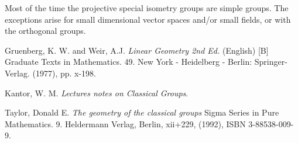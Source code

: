 \documentclass[12pt]{article}
\begin{document}
Most of the time the projective special isometry groups are simple groups.
The exceptions arise for small dimensional vector spaces and/or small fields, or with the orthogonal groups.



\providecommand{\bysame}{\leavevmode\hbox to3em{\hrulefill}\thinspace}
\providecommand{\MR}{\relax\ifhmode\unskip\space\fi MR }
\providecommand{\MRhref}[2]{%
\href{http://www.ams.org/mathscinet-getitem?mr=#1}{#2}
}
\providecommand{\href}[2]{#2}
\begin{thebibliography}{10}


Gruenberg, K. W. and Weir, A.J.
\emph{Linear Geometry 2nd Ed.} (English)
[B] Graduate Texts in Mathematics. 49. New York - Heidelberg - Berlin: Springer-Verlag. (1977), pp. x-198.

Kantor, W. M.
\emph{Lectures notes on Classical Groups}.

Taylor, Donald E.
\emph{The geometry of the classical groups}
Sigma Series in Pure Mathematics. 9.
Heldermann Verlag, Berlin, xii+229, (1992), ISBN 3-88538-009-9.

\end{thebibliography}


\end{document}
